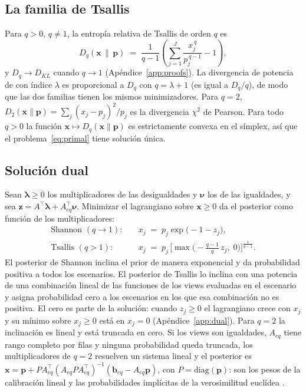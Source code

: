 \documentclass[11pt]{article}
\newcommand{\p}{\mathbf{p}}
\newcommand{\x}{\mathbf{x}}
\begin{document}
\subsection{La familia de Tsallis}

Para $q > 0$, $q \neq 1$, la entrop\'ia relativa de Tsallis de orden $q$ es
\begin{equation}\label{eq:tsallis}
D_q(\x \,\|\, \p) \;=\; \frac{1}{q-1}\left( \sum_{j=1}^{J} \frac{x_j^{\,q}}{p_j^{\,q-1}} - 1 \right),
\end{equation}
y $D_q \to D_{KL}$ cuando $q\to 1$ (Ap\'endice~\ref{app:proofs}). La
divergencia de potencia de \citet{CressieRead1984} con \'indice $\lambda$ es
proporcional a $D_q$ con $q = \lambda + 1$ (es igual a $D_q/q$), de modo que
las dos familias
tienen los mismos minimizadores. Para $q=2$,
$D_2(\x\|\p) = \sum_j (x_j-p_j)^2/p_j$ es la divergencia $\chi^2$ de
Pearson. Para todo $q>0$ la funci\'on $\x \mapsto D_q(\x\|\p)$ es
estrictamente convexa en el s\'implex, as\'i que el
problema~\eqref{eq:primal} tiene soluci\'on \'unica.

\subsection{Soluci\'on dual}\label{sec:dual}

Sean $\boldsymbol{\lambda} \ge 0$ los multiplicadores de las desigualdades
y $\boldsymbol{\nu}$ los de las igualdades, y sea
$\mathbf{z} = A^\top \boldsymbol{\lambda} + A_{eq}^\top \boldsymbol{\nu}$.
Minimizar el lagrangiano sobre $\x \ge 0$ da el posterior como funci\'on de
los multiplicadores:
\begin{align}
\text{Shannon } (q \to 1): \quad & x_j \;=\; p_j \exp\!\big( - 1 - z_j \big), \label{eq:kkt-shannon}\\[2pt]
\text{Tsallis } (q > 1): \quad & x_j \;=\; p_j \,\Big[ \max\!\Big( -\frac{q-1}{q}\, z_j,\; 0 \Big) \Big]^{\frac{1}{q-1}}. \label{eq:kkt-tsallis}
\end{align}
El posterior de Shannon inclina el prior de manera exponencial y da
probabilidad positiva a todos los escenarios. El posterior de Tsallis lo
inclina con una potencia de una combinaci\'on lineal de las funciones de los
views evaluadas en el escenario y asigna probabilidad cero a los
escenarios en los que esa combinaci\'on no es positiva. El
cero es parte de la soluci\'on: cuando $z_j \ge 0$ el lagrangiano crece con
$x_j$ y su m\'inimo sobre $x_j \ge 0$ est\'a en $x_j = 0$
(Ap\'endice~\ref{app:dual}). Para $q=2$ la inclinaci\'on es lineal y est\'a
truncada en cero. Si los views son igualdades, $A_{eq}$ tiene rango completo por filas y
ninguna probabilidad queda truncada, los multiplicadores de $q=2$ resuelven un sistema lineal y el
posterior es
$\x = \p + P A_{eq}^\top (A_{eq} P A_{eq}^\top)^{-1}
(\mathbf{b}_{eq} - A_{eq}\p)$, con $P = \mathrm{diag}(\p)$: son los pesos de
la calibraci\'on lineal \citep{DevilleSarndal1992} y las probabilidades
impl\'icitas de la verosimilitud eucl\'idea
\citep{AntoineBonnalRenault2007}.
\end{document}
